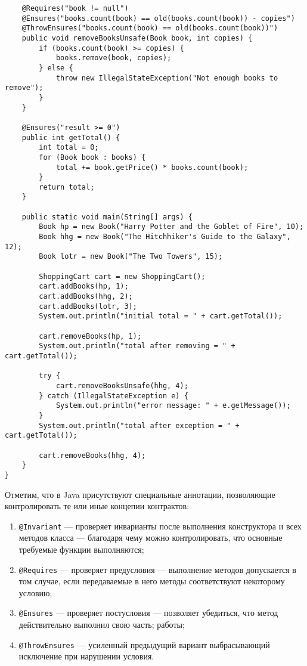 \begin{lstlisting}
    @Requires("book != null")
    @Ensures("books.count(book) == old(books.count(book)) - copies")
    @ThrowEnsures("books.count(book) == old(books.count(book))")
    public void removeBooksUnsafe(Book book, int copies) {
        if (books.count(book) >= copies) {
            books.remove(book, copies);
        } else {
            throw new IllegalStateException("Not enough books to remove");
        }
    }
 
    @Ensures("result >= 0")
    public int getTotal() {
        int total = 0;
        for (Book book : books) {
            total += book.getPrice() * books.count(book);
        }
        return total;
    }
 
    public static void main(String[] args) {
        Book hp = new Book("Harry Potter and the Goblet of Fire", 10);
        Book hhg = new Book("The Hitchhiker's Guide to the Galaxy", 12);
        Book lotr = new Book("The Two Towers", 15);
 
        ShoppingCart cart = new ShoppingCart();
        cart.addBooks(hp, 1);
        cart.addBooks(hhg, 2);
        cart.addBooks(lotr, 3);
        System.out.println("initial total = " + cart.getTotal());
 
        cart.removeBooks(hp, 1);
        System.out.println("total after removing = " + cart.getTotal());
 
        try {
            cart.removeBooksUnsafe(hhg, 4);
        } catch (IllegalStateException e) {
            System.out.println("error message: " + e.getMessage());
        }
        System.out.println("total after exception = " + cart.getTotal());
 
        cart.removeBooks(hhg, 4);
    }
}
\end{lstlisting}

Отметим, что в Java присутствуют специальные аннотации, позволяющие контролировать те или иные концепии контрактов:

\begin{enumerate}
    \item \verb|@Invariant| — проверяет инварианты после выполнения конструктора и всех методов класса — благодаря чему можно контролировать, что основные требуемые функции выполняются;
    \item \verb|@Requires| — проверяет предусловия — выполнение методов допускается в том случае, если передаваемые в него методы соответствуют некоторому условию;
    \item \verb|@Ensures| — проверяет постусловия — позволяет убедиться, что метод действительно выполнил свою часть; работы;
    \item \verb|@ThrowEnsures| — усиленный предыдущий вариант выбрасывающий исключение при нарушении условия.
\end{enumerate}

